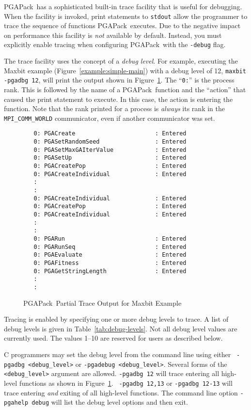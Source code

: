 \documentclass{report}
\newcommand{\pga}{PGAPack}
\begin{document}
\pga\ has a sophisticated built-in trace facility that is useful for
debugging.  When the facility is invoked, print statements to {\tt stdout}
allow the programmer to trace the sequence of functions \pga\ executes.  Due
to the negative impact on performance this facility is {\em not} available by
default.  Instead, you must explicitly enable tracing when configuring 
\pga\  with the {\tt -debug} flag.

The trace facility uses the concept  of a {\em debug
level}.  For example, executing the Maxbit example
(Figure~\ref{example:simple-main}) with a debug level of 12, {\tt maxbit
-pgadbg 12}, will print the output shown in Figure~\ref{fig:trace}.  The
``{\tt 0:}'' is the process rank.  This is followed by the name of a
\pga\ function and the ``action'' that caused the print statement to execute.
In this case, the action is entering the function.  Note that the rank printed
for a process is {\em always} its rank in the {\tt MPI\_COMM\_WORLD}
communicator, even if another communicator was set.


\begin{figure}
\begin{verbatim}
   0: PGACreate                       : Entered
   0: PGASetRandomSeed                : Entered
   0: PGASetMaxGAIterValue            : Entered
   0: PGASetUp                        : Entered
   0: PGACreatePop                    : Entered
   0: PGACreateIndividual             : Entered
   :
   :
   0: PGACreateIndividual             : Entered
   0: PGACreatePop                    : Entered
   0: PGACreateIndividual             : Entered
   :
   :
   0: PGARun                          : Entered
   0: PGARunSeq                       : Entered
   0: PGAEvaluate                     : Entered
   0: PGAFitness                      : Entered
   0: PGAGetStringLength              : Entered
   :
   :
\end{verbatim}
\caption{\pga\ Partial Trace Output for Maxbit Example}
\label{fig:trace}
\end{figure}


Tracing is enabled by specifying one or more debug levels to trace.  A list of
debug levels is given in Table~\ref{tab:debug-levels}.  Not all debug level
values are currently used.  The values 1--10 are reserved for users as
described below.

C programmers may set the debug level from the command line using either {\tt
-pgadbg <debug\_level>} or {\tt -pgadebug <debug\_level>}.  Several forms of
the {\tt <debug\_level>} argument are allowed.  {\tt -pgadbg 12} will trace
entering all high-level functions as shown in Figure~\ref{fig:trace}.  {\tt
-pgadbg 12,13} or {\tt -pgadbg 12-13} will trace entering {\em and} exiting of
all high-level functions.  The command line option {\tt -pgahelp debug} will
list the debug level options and then exit.
\end{document}
